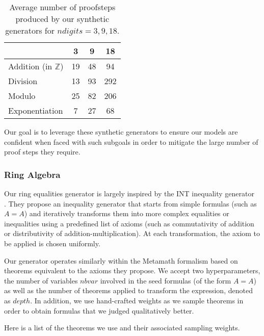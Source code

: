 \documentclass{article}
\begin{document}
\begin{table}[ht]
\caption{Average number of proofsteps produced by our synthetic generators for $\mathit{ndigits}=3,9,18$.}
\centering
\begin{tabular}{ |l|c|c|c| }
    \hline
     & 3 & 9 & 18 \\
    \hline
    Addition (in $\mathbb{Z}$) & 19 & 48 & 94 \\
    Division & 13 & 93 & 292 \\
    Modulo & 25 & 82 & 206 \\
    Exponentiation & 7 & 27 & 68 \\
    \hline
\end{tabular}
\label{table:proofsteps}
\end{table}

Our goal is to leverage these synthetic generators to ensure our models are confident when faced with such subgoals in order to mitigate the large number of proof steps they require.

\subsubsection{Ring Algebra}

Our ring equalities generator is largely inspired by the INT inequality generator~\cite{wu2020int} . They propose an inequality generator that starts from simple formulas (such as $A=A$) and iteratively transforms them into more complex equalities or inequalities using a predefined list of axioms (such as commutativity of addition or distributivity of addition-multiplication). At each transformation, the axiom to be applied is chosen uniformly.

Our generator operates similarly within the Metamath formalism based on theorems equivalent to the axioms they propose. We accept two hyperparameters, the number of variables $\mathit{nbvar}$ involved in the seed formulas (of the form $A=A$) as well as the number of theorems applied to transform the expression, denoted as $\mathit{depth}$. In addition, we use hand-crafted weights as we sample theorems in order to obtain formulas that we judged qualitatively better.

Here is a list of the theorems we use and their associated sampling weights.
\end{document}
